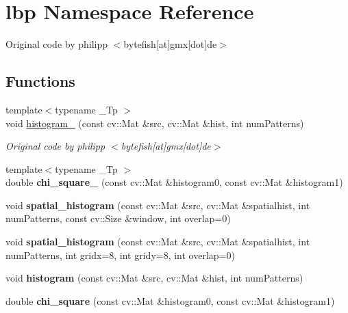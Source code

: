 \section{lbp Namespace Reference}
\label{namespacelbp}


Original code by philipp $<$bytefish\mbox{[}at\mbox{]}gmx\mbox{[}dot\mbox{]}de$>$  


\subsection*{Functions}
\begin{DoxyCompactItemize}
\item 
{\footnotesize template$<$typename \+\_\+\+Tp $>$ }\\void \hyperlink{namespacelbp_a7a2d45fdc785282bc110d25495ef78d7}{histogram\+\_\+} (const cv\+::\+Mat \&src, cv\+::\+Mat \&hist, int num\+Patterns)
\begin{DoxyCompactList}\small\item\em Original code by philipp $<$bytefish\mbox{[}at\mbox{]}gmx\mbox{[}dot\mbox{]}de$>$ \end{DoxyCompactList}\item 
{\footnotesize template$<$typename \+\_\+\+Tp $>$ }\\double {\bfseries chi\+\_\+square\+\_\+} (const cv\+::\+Mat \&histogram0, const cv\+::\+Mat \&histogram1)\label{namespacelbp_a7f6233ae8ce09653d048465413e5a40f}

\item 
void {\bfseries spatial\+\_\+histogram} (const cv\+::\+Mat \&src, cv\+::\+Mat \&spatialhist, int num\+Patterns, const cv\+::\+Size \&window, int overlap=0)\label{namespacelbp_a033b381259dbac1e636bf1729abd0d84}

\item 
void {\bfseries spatial\+\_\+histogram} (const cv\+::\+Mat \&src, cv\+::\+Mat \&spatialhist, int num\+Patterns, int gridx=8, int gridy=8, int overlap=0)\label{namespacelbp_afe088914321c9c6210cdb611aa6c2fa9}

\item 
void {\bfseries histogram} (const cv\+::\+Mat \&src, cv\+::\+Mat \&hist, int num\+Patterns)\label{namespacelbp_a1ec08379651e945f526ee485960feb55}

\item 
double {\bfseries chi\+\_\+square} (const cv\+::\+Mat \&histogram0, const cv\+::\+Mat \&histogram1)\label{namespacelbp_abc2c2aedd18a2a6edd9c128c843bb572}


\end{DoxyCompactItemize}

